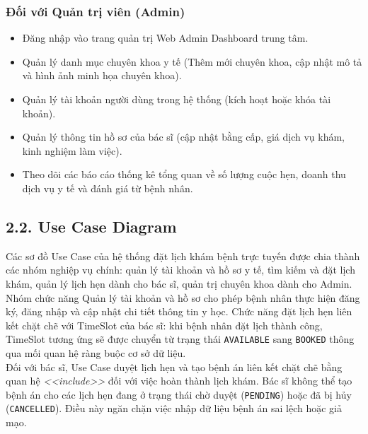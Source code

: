 \documentclass[12pt,a4paper]{report}
\begin{document}
\subsubsection*{Đối với Quản trị viên (Admin)}
\begin{itemize}
    \item Đăng nhập vào trang quản trị Web Admin Dashboard trung tâm.
    \item Quản lý danh mục chuyên khoa y tế (Thêm mới chuyên khoa, cập nhật mô tả và hình ảnh minh họa chuyên khoa).
    \item Quản lý tài khoản người dùng trong hệ thống (kích hoạt hoặc khóa tài khoản).
    \item Quản lý thông tin hồ sơ của bác sĩ (cập nhật bằng cấp, giá dịch vụ khám, kinh nghiệm làm việc).
    \item Theo dõi các báo cáo thống kê tổng quan về số lượng cuộc hẹn, doanh thu dịch vụ y tế và đánh giá từ bệnh nhân.
\end{itemize}

\subsection*{2.2. Use Case Diagram}
\hspace{1em} Các sơ đồ Use Case của hệ thống đặt lịch khám bệnh trực tuyến được chia thành các nhóm nghiệp vụ chính: quản lý tài khoản và hồ sơ y tế, tìm kiếm và đặt lịch khám, quản lý lịch hẹn dành cho bác sĩ, quản trị chuyên khoa dành cho Admin.
\\[0.4cm]
\indent Nhóm chức năng Quản lý tài khoản và hồ sơ cho phép bệnh nhân thực hiện đăng ký, đăng nhập và cập nhật chi tiết thông tin y học. Chức năng đặt lịch hẹn liên kết chặt chẽ với TimeSlot của bác sĩ: khi bệnh nhân đặt lịch thành công, TimeSlot tương ứng sẽ được chuyển từ trạng thái \texttt{AVAILABLE} sang \texttt{BOOKED} thông qua mối quan hệ ràng buộc cơ sở dữ liệu.
\\[0.4cm]
\indent Đối với bác sĩ, Use Case duyệt lịch hẹn và tạo bệnh án liên kết chặt chẽ bằng quan hệ \textit{<<include>>} đối với việc hoàn thành lịch khám. Bác sĩ không thể tạo bệnh án cho các lịch hẹn đang ở trạng thái chờ duyệt (\texttt{PENDING}) hoặc đã bị hủy (\texttt{CANCELLED}). Điều này ngăn chặn việc nhập dữ liệu bệnh án sai lệch hoặc giả mạo.
\end{document}
